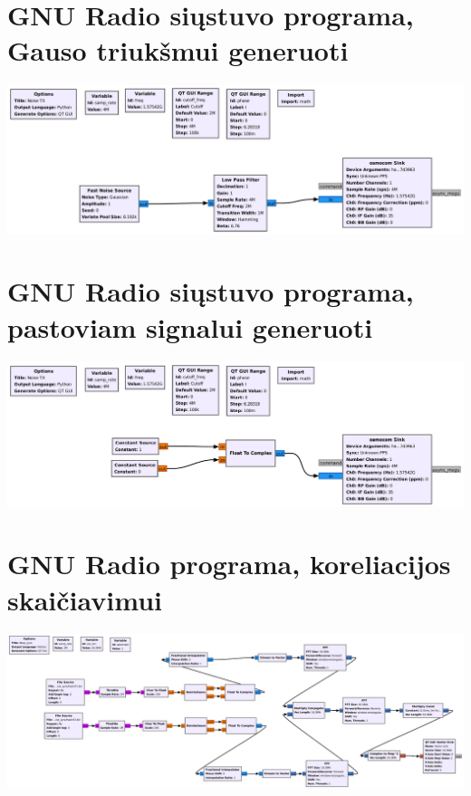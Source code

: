 \documentclass[../gnss_interference_resistant_thesis.tex]{subfiles}
\begin{document}
\appendix

\section{GNU Radio siųstuvo programa, Gauso triukšmui generuoti}

\begin{centering}
    \includegraphics[angle=90, scale=0.5]{hackrf_tx_noise}
\par\end{centering}

\section{GNU Radio siųstuvo programa, pastoviam signalui generuoti}

\begin{centering}
    \includegraphics[angle=90, scale=0.5]{hackrf_tx}
\par\end{centering}

\section{GNU Radio programa, koreliacijos skaičiavimui}

\begin{centering}
    \includegraphics[angle=90, scale=0.32]{hackr_correlation}
\par\end{centering}
\end{document}
